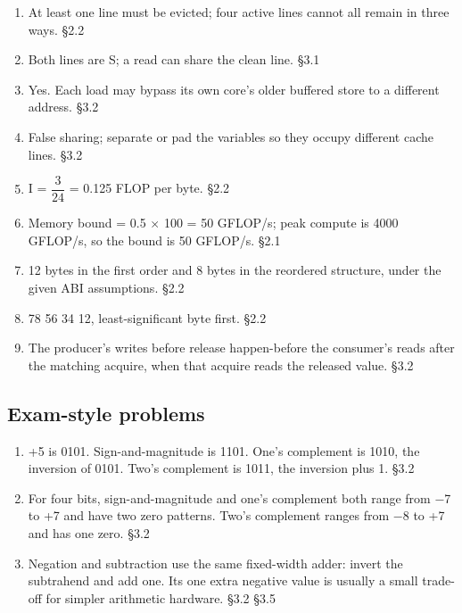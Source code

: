\documentclass[11pt]{article}
\begin{document}
\begin{keepsection}
\begin{enumerate}
\item At least one line must be evicted; four active lines cannot all remain in three ways. \hfill{\small\color{FAUblue}§2.2}
\item Both lines are S; a read can share the clean line. \hfill{\small\color{FAUblue}§3.1}
\item Yes. Each load may bypass its own core’s older buffered store to a different address. \hfill{\small\color{FAUblue}§3.2}
\item False sharing; separate or pad the variables so they occupy different cache lines. \hfill{\small\color{FAUblue}§3.2}
\item I = {\small\ensuremath{\dfrac{3}{24}}} = 0.125 FLOP per byte. \hfill{\small\color{FAUblue}§2.2}
\item Memory bound = 0.5 \ensuremath{\times} 100 = 50 GFLOP/s; peak compute is 4000 GFLOP/s, so the bound is 50 GFLOP/s. \hfill{\small\color{FAUblue}§2.1}
\item 12 bytes in the first order and 8 bytes in the reordered structure, under the given ABI assumptions. \hfill{\small\color{FAUblue}§2.2}
\item 78 56 34 12, least-significant byte first. \hfill{\small\color{FAUblue}§2.2}
\item The producer’s writes before release happen-before the consumer’s reads after the matching acquire, when that acquire reads the released value. \hfill{\small\color{FAUblue}§3.2}
\end{enumerate}

\end{keepsection}
\begin{keepsection}\subsection{Exam-style problems}

\begin{enumerate}
\item +5 is 0101. Sign-and-magnitude is 1101. One’s complement is 1010, the inversion of 0101. Two’s complement is 1011, the inversion plus 1. \hfill{\small\color{FAUblue}§3.2}
\item For four bits, sign-and-magnitude and one’s complement both range from \ensuremath{-}7 to +7 and have two zero patterns. Two’s complement ranges from \ensuremath{-}8 to +7 and has one zero. \hfill{\small\color{FAUblue}§3.2}
\item Negation and subtraction use the same fixed-width adder: invert the subtrahend and add one. Its one extra negative value is usually a small trade-off for simpler arithmetic hardware. \hfill{\small\color{FAUblue}§3.2} \hfill{\small\color{FAUblue}§3.5}
\end{enumerate}

\end{keepsection}
\end{document}

